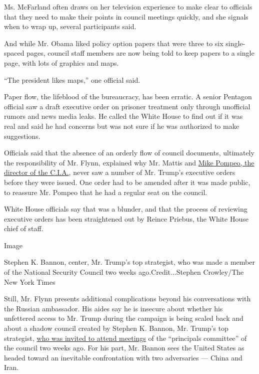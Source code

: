 Ms. McFarland often draws on her television experience to make clear to
officials that they need to make their points in council meetings
quickly, and she signals when to wrap up, several participants said.

And while Mr. Obama liked policy option papers that were three to six
single-spaced pages, council staff members are now being told to keep
papers to a single page, with lots of graphics and maps.

``The president likes maps,'' one official said.

Paper flow, the lifeblood of the bureaucracy, has been erratic. A senior
Pentagon official saw a draft executive order on prisoner treatment only
through unofficial rumors and news media leaks. He called the White
House to find out if it was real and said he had concerns but was not
sure if he was authorized to make suggestions.

Officials said that the absence of an orderly flow of council documents,
ultimately the responsibility of Mr. Flynn, explained why Mr. Mattis and
\href{https://www.nytimes.com/2017/01/11/us/politics/mike-pompeo-cia-trump-nominee.html}{Mike
Pompeo, the director of the C.I.A.}, never saw a number of Mr. Trump's
executive orders before they were issued. One order had to be amended
after it was made public, to reassure Mr. Pompeo that he had a regular
seat on the council.

White House officials say that was a blunder, and that the process of
reviewing executive orders has been straightened out by Reince Priebus,
the White House chief of staff.

Image

Stephen K. Bannon, center, Mr. Trump's top strategist, who was made a
member of the National Security Council two weeks ago.Credit...Stephen
Crowley/The New York Times

Still, Mr. Flynn presents additional complications beyond his
conversations with the Russian ambassador. His aides say he is insecure
about whether his unfettered access to Mr. Trump during the campaign is
being scaled back and about a shadow council created by Stephen K.
Bannon, Mr. Trump's top strategist,
\href{https://www.nytimes.com/2017/01/29/us/stephen-bannon-donald-trump-national-security-council.html}{who
was invited to attend meetings} of the ``principals committee'' of the
council two weeks ago. For his part, Mr. Bannon sees the United States
as headed toward an inevitable confrontation with two adversaries ---
China and Iran.

